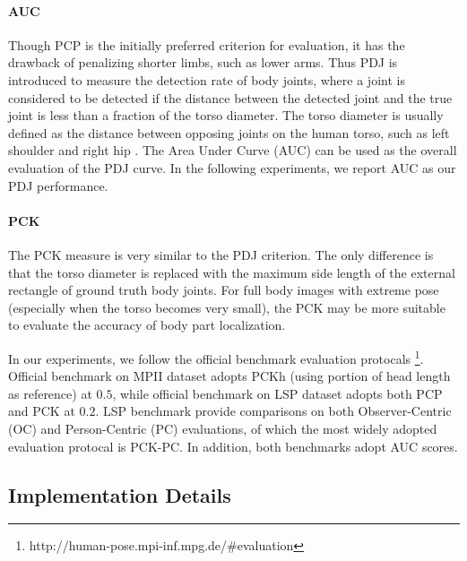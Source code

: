 \documentclass[journal ]{IEEEtran}
\begin{document}
\paragraph{AUC}
Though PCP is the initially preferred criterion for evaluation, it has the drawback of penalizing shorter limbs, such as lower arms. Thus PDJ is introduced \cite{toshev2014deeppose, sapp2013modec} to measure the detection rate of body joints, where a joint is considered to be detected if the distance between the detected joint and the true joint is less than a fraction of the torso diameter. The torso diameter is usually defined as the distance between opposing joints on the human torso, such as left shoulder and right hip \cite{toshev2014deeppose}. The Area Under Curve (AUC) can be used as the overall evaluation of the PDJ curve. In the following experiments, we report AUC as our PDJ performance.
\paragraph{PCK}
The PCK measure is very similar to the PDJ criterion. The only difference is that the torso diameter is replaced with the maximum side length of the external rectangle of ground truth body joints. For full body images with extreme pose (especially when the torso becomes very small), the PCK may be more suitable to evaluate the accuracy of body part localization.

In our experiments, we follow the official benchmark evaluation protocals \footnote{http://human-pose.mpi-inf.mpg.de/\#evaluation}. 
Official benchmark on MPII dataset adopts PCKh (using portion of head length as reference) at $0.5$, while official benchmark on LSP dataset adopts both PCP and PCK at $0.2$. LSP benchmark provide comparisons on both Observer-Centric (OC) and Person-Centric (PC) evaluations, of which the most widely adopted evaluation protocal is PCK-PC. In addition, both benchmarks adopt AUC scores.

\subsection{Implementation Details}
\end{document}
